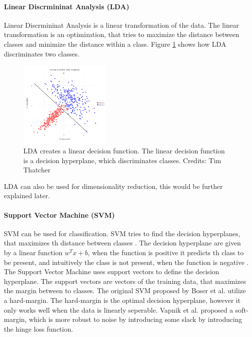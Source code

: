 \paragraph{Linear Discrmininat Analysis (LDA)}

Linear Discrmininat Analysis is a linear transformation of the data. The linear transformation is an optimization, that tries to maximize the distance between classes and minimize the distance within a class\cite{AIML}. Figure \ref{fig:lda_dec} shows how LDA discriminates two classes.

\begin{figure}[H]
    \centering
    \includegraphics[width=0.4\textwidth]{figures/lda_deci.png}
    \caption[]{LDA creates a linear decision function. The linear decision function is a decision hyperplane, which discriminates classes. Credits: Tim Thatcher}
    \label{fig:lda_dec}
\end{figure}

LDA can also be used for dimensionality reduction, this would be further explained later.

\paragraph{Support Vector Machine (SVM)}

SVM can be used for classification. SVM tries to find the decision hyperplanes, that maximizes th distance between classes \cite{IR}. The decision hyperplane are given by a linear function $w^Tx+b$, when the function is positive it predicts th class to be present, and intuitively the class is not present, when the function is negative \cite{Goodfellow-et-al-2016}. The Support Vector Machine uses support vectors to define the decision hyperplane. The support vectors are vectors of the training data, that maximizes the margin between to classes. The original SVM proposed by Boser et al. \cite{Boser} utilize a hard-margin. The hard-margin is the optimal decision hyperplane, however it only works well when the data is linearly seperable. Vapnik et al. \cite{Vapnik} proposed a soft-margin, which is more robust to noise by introducing some slack by introducing the hinge loss function.

